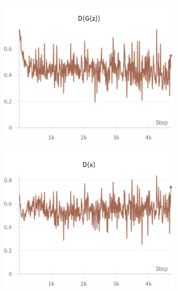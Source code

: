 \begin{figure}[H]
    \begin{subfigure}{0.45\textwidth}
        \centering
        \includegraphics[width=0.95\linewidth]{ndf/8/D_G_z.png}
        \caption{}
        \label{subfig:ndf/8/D_G_z}
    \end{subfigure}%
    \begin{subfigure}{0.45\textwidth}
        \centering
        \includegraphics[width=0.95\linewidth]{ndf/8/D_x.png}
        \caption{}
        \label{subfig:ndf/8/D_x}
    \end{subfigure}


\end{figure}
